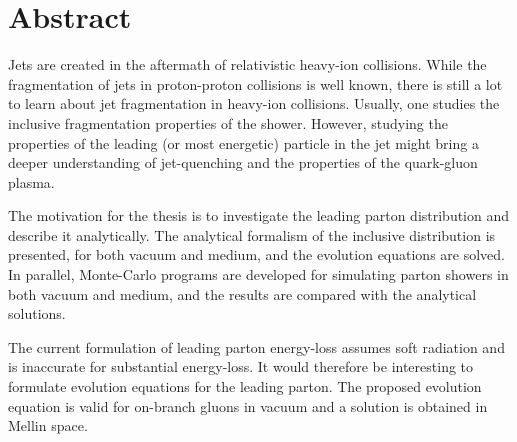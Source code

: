 \documentclass[main.tex]{subfiles}
\begin{document}
\chapter*{Abstract}\label{cpt:abst}
Jets are created in the aftermath of relativistic heavy-ion collisions. While the fragmentation of jets in proton-proton collisions is well known, there is still a lot to learn about jet fragmentation in heavy-ion collisions. Usually, one studies the inclusive fragmentation properties of the shower. However, studying the properties of the leading (or most energetic) particle in the jet might bring a deeper understanding of jet-quenching and the properties of the quark-gluon plasma.

The motivation for the thesis is to investigate the leading parton distribution and describe it analytically. The analytical formalism of the inclusive distribution is presented, for both vacuum and medium, and the evolution equations are solved. In parallel, Monte-Carlo programs are developed for simulating parton showers in both vacuum and medium, and the results are compared with the analytical solutions. 

The current formulation of leading parton energy-loss assumes soft radiation and is inaccurate for substantial energy-loss. It would therefore be interesting to formulate evolution equations for the leading parton. The proposed evolution equation is valid for on-branch gluons in vacuum and a solution is obtained in Mellin space.
\end{document}
